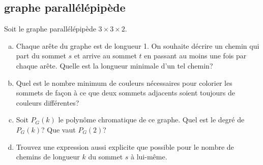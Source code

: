 \subsection{graphe parallélépipède}
Soit le graphe parallélépipède $3 \times 3 \times 2$.

\begin{enumerate}[(a)]
  \item Chaque arête du graphe est de longueur 1. On souhaite décrire un chemin qui part du sommet $s$ et arrive au sommet $t$ en passant au moins une fois par chaque arête. Quelle est la longueur minimale d'un tel chemin?
  \item Quel est le nombre minimum de couleurs nécessaires pour colorier les sommets de façon à ce que deux sommets adjacents soient toujours de couleurs différentes?
  \item Soit $P_G(k)$ le polynôme chromatique de ce graphe. Quel est le degré de $P_G(k)$? Que vaut $P_G(2)$?
  \item Trouvez une expression aussi explicite que possible pour le nombre de chemins de longueur $k$ du sommet $s$ à lui-même.
\end{enumerate}
